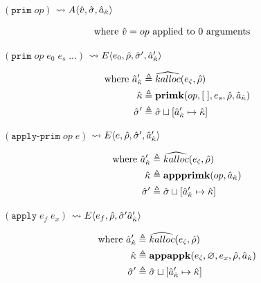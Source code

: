 \documentclass[12pt,draft]{article}
\newcommand{\primsyn}[2]{(\texttt{prim}\;#1\;#2\;...)}
\newcommand{\singleprimsyn}[1]{(\texttt{prim}\;#1)}
\newcommand{\applyprimsyn}[2]{(\texttt{apply-prim}\;#1\;#2)}
\newcommand{\applysyn}[2]{(\texttt{apply}\;#1\;#2)}
\begin{document}
{\begin{multicols*}{2}
\begin{center}
  $\singleprimsyn{op}$
  $\leadsto A\langle \hat{v} , \hat{\sigma} , \hat{a}_{\hat{\kappa}} \rangle$
\end{center}
\vspace{-7mm}
\begin{align*}
\text{where } \hat{v} &= op \text{ applied to } 0 \text{ arguments}
\end{align*}
\begin{center}
  $\primsyn{op}{e_0\;e_s}$
  $\leadsto E\langle e_0 , \hat{\rho} , \hat{\sigma}' , \hat{a}_{\hat{\kappa}}' \rangle$
\end{center}
\vspace{-7mm}
\begin{align*}
  \text{where }
  \hat{a}_{\hat{\kappa}}' &\triangleq \widehat{kalloc}(e_{\hat{\varsigma}} , \hat{\rho}) \\
  \hat{\kappa} &\triangleq \textbf{primk}(op , [\;] , e_s , \hat{\rho} , \hat{a}_{\hat{\kappa}}) \\
  \hat{\sigma}' &\triangleq \hat{\sigma} \sqcup [\hat{a}_{\hat{\kappa}}' \mapsto \hat{\kappa}]
\end{align*}
\begin{center}
  $\applyprimsyn{op}{e}$
  $\leadsto E\langle e , \hat{\rho} , \hat{\sigma}' , \hat{a}_{\hat{\kappa}}' \rangle$
\end{center}
\vspace{-7mm}
\begin{align*}
  \text{where }
  \hat{a}_{\hat{\kappa}}' &\triangleq \widehat{kalloc}(e_{\hat{\varsigma}} , \hat{\rho}) \\
  \hat{\kappa} &\triangleq \textbf{appprimk}(op, \hat{a}_{\hat{\kappa}}) \\
  \hat{\sigma}' &\triangleq \hat{\sigma} \sqcup [\hat{a}_{\hat{\kappa}}' \mapsto \hat{\kappa}]
\end{align*}
\begin{center}
  $\applysyn{e_f}{e_x}$
  $\leadsto E\langle e_f , \hat{\rho} , \hat{\sigma}' \hat{a}_{\hat{\kappa}}' \rangle$
\end{center}
\vspace{-7mm}
\begin{align*}
  \text{where }
  \hat{a}_{\hat{\kappa}}' &\triangleq \widehat{kalloc}(e_{\hat{\varsigma}} , \hat{\rho}) \\
  \hat{\kappa} &\triangleq \textbf{appappk}(e_{\hat{\varsigma}} , \varnothing , e_x , \hat{\rho} , \hat{a}_{\hat{\kappa}}) \\
  \hat{\sigma}' &\triangleq \hat{\sigma} \sqcup [\hat{a}_{\hat{\kappa}}' \mapsto \hat{\kappa}]
\end{align*}

\end{multicols*}}
\end{document}

